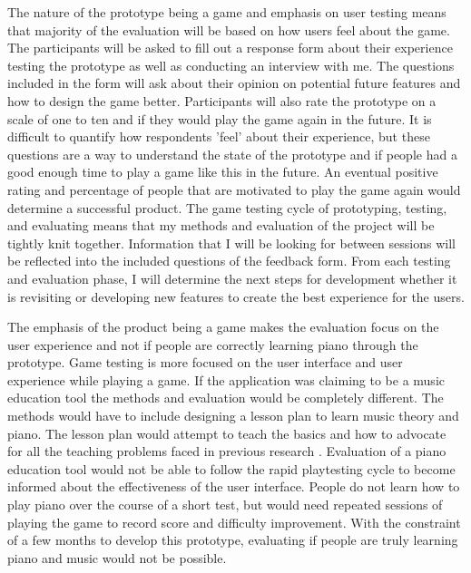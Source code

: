 \documentclass[10pt,twocolumn]{article}
\begin{document}
The nature of the prototype being a game and emphasis on user testing means that majority of the evaluation will be based on how users feel about the game. The participants will be asked to fill out a response form about their experience testing the prototype as well as conducting an interview with me. The questions included in the form will ask about their opinion on potential future features and how to design the game better. Participants will also rate the prototype on a scale of one to ten and if they would play the game again in the future. It is difficult to quantify how respondents 'feel' about their experience, but these questions are a way to understand the state of the prototype and if people had a good enough time to play a game like this in the future. An eventual positive rating and percentage of people that are motivated to play the game again would determine a successful product. The game testing cycle of prototyping, testing, and evaluating means that my methods and evaluation of the project will be tightly knit together. Information that I will be looking for between sessions will be reflected into the included questions of the feedback form. From each testing and evaluation phase, I will determine the next steps for development whether it is revisiting or developing new features to create the best experience for the users. 

The emphasis of the product being a game makes the evaluation focus on the user experience and not if people are correctly learning piano through the prototype. Game testing is more focused on the user interface and user experience while playing a game. If the application was claiming to be a music education tool the methods and evaluation would be completely different. The methods would have to include designing a lesson plan to learn music theory and piano. The lesson plan would attempt to teach the basics and how to advocate for all the teaching problems faced in previous research \cite{PianoTeachingandthePandemic} \cite{E-LearningPiano} \cite{Computer-AssistedInstructionPianoEducation}. Evaluation of a piano education tool would not be able to follow the rapid playtesting cycle to become informed about the effectiveness of the user interface. People do not learn how to play piano over the course of a short test, but would need repeated sessions of playing the game to record score and difficulty improvement. With the constraint of a few months to develop this prototype, evaluating if people are truly learning piano and music would not be possible. 
\end{document}
